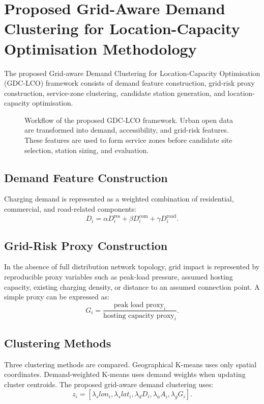 \section{Proposed Grid-Aware Demand Clustering for Location-Capacity Optimisation Methodology}

The proposed Grid-aware Demand Clustering for Location-Capacity Optimisation (GDC-LCO) framework consists of demand feature construction, grid-risk proxy construction, service-zone clustering, candidate station generation, and location-capacity optimisation.

\begin{figure}[!t]
\centering

\caption{Workflow of the proposed GDC-LCO framework. Urban open data are transformed into demand, accessibility, and grid-risk features. These features are used to form service zones before candidate site selection, station sizing, and evaluation.}
\label{fig:method_flowchart}
\end{figure}

\subsection{Demand Feature Construction}
Charging demand is represented as a weighted combination of residential, commercial, and road-related components:
\begin{equation}
D_i = \alpha D_i^{\text{res}} + \beta D_i^{\text{com}} + \gamma D_i^{\text{road}}.
\end{equation}

\subsection{Grid-Risk Proxy Construction}
In the absence of full distribution network topology, grid impact is represented by reproducible proxy variables such as peak-load pressure, assumed hosting capacity, existing charging density, or distance to an assumed connection point. A simple proxy can be expressed as:
\begin{equation}
G_i = \frac{\text{peak load proxy}_i}{\text{hosting capacity proxy}_i}.
\end{equation}

\subsection{Clustering Methods}
Three clustering methods are compared. Geographical K-means uses only spatial coordinates. Demand-weighted K-means uses demand weights when updating cluster centroids. The proposed grid-aware demand clustering uses:
\begin{equation}
z_i = [\lambda_s lon_i, \lambda_s lat_i, \lambda_d D_i, \lambda_a A_i, \lambda_g G_i].
\end{equation}

